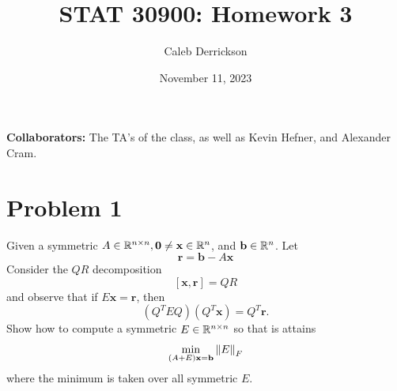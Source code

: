 

\title{STAT 30900: Homework 3}
\author{Caleb Derrickson}
\date{November 11, 2023}


\onehalfspacing
\maketitle
\allowdisplaybreaks
{\color{cit}\vspace{2mm}\noindent\textbf{Collaborators:}} The TA's of the class, as well as Kevin Hefner, and Alexander Cram.

\tableofcontents

\newpage
\section{Problem 1}
Given a symmetric $A \in \mathbb{R}^{n\times n}, \textbf{0} \neq \textbf{x} \in \mathbb{R}^n$, and $\textbf{b} \in \mathbb{R}^n$. Let 
\[
\textbf{r} = \textbf{b} - A\textbf{x}
\]
Consider the $QR$ decomposition
\[
[\textbf{x}, \textbf{r}] = QR
\]
and observe that if $E\textbf{x} = \textbf{r}$, then
\[
(Q^TEQ)(Q^T\textbf{x}) = Q^T\textbf{r}.
\]
Show how to compute a symmetric $E \in \mathbb{R}^{n\times n}$ so that is attains 
\[
\min_{(A+E)\textbf{x} = \textbf{b}}\norm{E}_F
\]
where the minimum is taken over all symmetric $E$.
\partbreak
